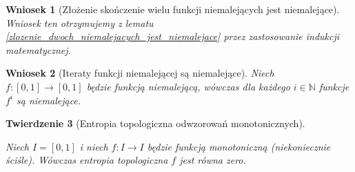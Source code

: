 \documentclass[licencjacka]{pwr_wmat_praca_dyplomowa}
\theoremstyle{plain}
\newtheorem{theorem}{Twierdzenie}
\numberwithin{theorem}{chapter}
\newtheorem{corollary}[theorem]{Wniosek}
\theoremstyle{definition}
\numberwithin{theorem}{chapter}
\begin{document}
\begin{corollary}[Złożenie skończenie wielu funkcji niemalejących jest niemalejące]
\label{zlozenie_skonczenie_wielu_niemalejacych_jest_niemalejace}
Wniosek ten otrzymujemy z lematu \ref{zlozenie_dwoch_niemalejacych_jest_niemalejace} przez zastosowanie indukcji matematycznej.
\end{corollary}

\begin{corollary}[Iteraty funkcji niemalejącej są niemalejące]
\label{iteraty_niemalejacych_sa_niemalejace}
Niech $f: [0, 1] \rightarrow [0, 1]$ będzie funkcją niemalejącą, wówczas dla każdego $i \in \mathbb{N}$ funkcje $f^{i}$ są niemalejące.
\end{corollary}

 
 
\begin{theorem}[Entropia topologiczna odwzorowań monotonicznych]
\label{entropia_topologiczna_odwzorowan_monotonicznych}

Niech $I = [0, 1]$ i niech $f: I \rightarrow I$ będzie funkcją monotoniczną (niekoniecznie ściśle).
Wówczas entropia topologiczna $f$ jest równa zero.
\end{theorem}
\end{document}

